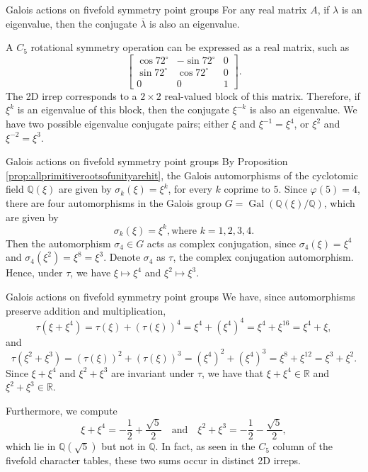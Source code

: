 \documentclass{beamer}
\newcommand{\vs}{\vspace{5mm}}
\DeclareMathOperator{\Gal}{Gal}
\begin{document}
    \begin{frame}{Galois actions on fivefold symmetry point groups}
        For any real matrix $A$, if $\lambda$ is an eigenvalue, then the conjugate $\overline\lambda$ is also an eigenvalue.
        \vs

        A $C_5$ rotational symmetry operation can be expressed as a real matrix, such as \[\begin{bmatrix}\cos 72^\circ&-\sin72^\circ&0\\\sin72^\circ&\cos72^\circ&0\\0&0&1\end{bmatrix}.\] The 2D irrep corresponds to a $2\times 2$ real-valued block of this matrix. Therefore, if $\xi^k$ is an eigenvalue of this block, then the conjugate $\xi^{-k}$ is also an eigenvalue. We have two possible eigenvalue conjugate pairs; either $\xi$ and $\xi^{-1}=\xi^4$, or $\xi^2$ and $\xi^{-2}=\xi^3$.
    \end{frame}

    \begin{frame}{Galois actions on fivefold symmetry point groups}
        By Proposition \ref{prop:allprimitiverootsofunityarehit}, the Galois automorphisms of the cyclotomic field $\mathbb{Q}(\xi)$ are given by $\sigma_k(\xi)=\xi^k$, for every $k$ coprime to $5$. Since $\varphi(5)=4$, there are four automorphisms in the Galois group $G=\Gal(\mathbb{Q}(\xi)/\mathbb{Q})$, which are given by
        \[\sigma_k(\xi)=\xi^k, \text{where } k=1,2,3,4.\] Then the automorphism $\sigma_4\in G$ acts as complex conjugation, since $\sigma_4(\xi)=\xi^4$ and $\sigma_4(\xi^2)=\xi^8=\xi^3$. Denote $\sigma_4$ as $\tau$, the complex conjugation automorphism. Hence, under $\tau$, we have $\xi\mapsto\xi^4$ and $\xi^2\mapsto\xi^3$.
    \end{frame}

    \begin{frame}{Galois actions on fivefold symmetry point groups}
        We have, since automorphisms preserve addition and multiplication, \[\tau(\xi+\xi^4)=\tau(\xi)+(\tau(\xi))^4=\xi^4+(\xi^4)^4=\xi^4+\xi^{16}=\xi^4+\xi,\] and \[\tau(\xi^2+\xi^3)=(\tau(\xi))^2+(\tau(\xi))^3=(\xi^4)^2+(\xi^4)^3=\xi^8+\xi^{12}=\xi^3+\xi^2.\] Since $\xi+\xi^4$ and $\xi^2+\xi^3$ are invariant under $\tau$, we have that $\xi+\xi^4\in\mathbb{R}$ and $\xi^2+\xi^3\in\mathbb{R}$.
        \vs

        {
            Furthermore, we compute \[\xi+\xi^4=-\frac12+\frac{\sqrt5}{2} \quad\text{and}\quad \xi^2+\xi^3=-\frac12-\frac{\sqrt5}{2},\] which lie in $\mathbb{Q}(\sqrt{5})$ but not in $\mathbb{Q}$. In fact, as seen in the $C_5$ column of the fivefold character tables, these two sums occur in distinct 2D irreps.
        }
    \end{frame}
\end{document}
